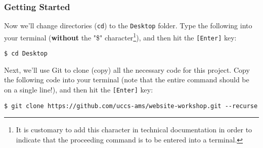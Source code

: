 \begin{frame}[fragile]
    \frametitle{Getting Started}

    Now we'll change directories (\texttt{cd}) to the \texttt{Desktop} folder.  Type the following into your terminal
    (\textbf{without} the "\$" character\footnote{
        It is customary to add this character in technical documentation in order to indicate that the proceeding
        command is to be entered into a terminal.
    }), and then hit the \texttt{[Enter]} key:
   
    \bigskip
    
    \begin{lstlisting}[style=saneCode,gobble=8]
        $ cd Desktop
    \end{lstlisting}

    \vfill
    Next, we'll use Git to clone (copy) all the necessary code for this project. Copy the following code into your 
    terminal (note that the entire command should be on a single line!), and then hit the \texttt{[Enter]} key:

    \bigskip

    \begin{lstlisting}[style=saneCode,gobble=8]
        $ git clone https://github.com/uccs-ams/website-workshop.git --recurse
    \end{lstlisting}


\end{frame}